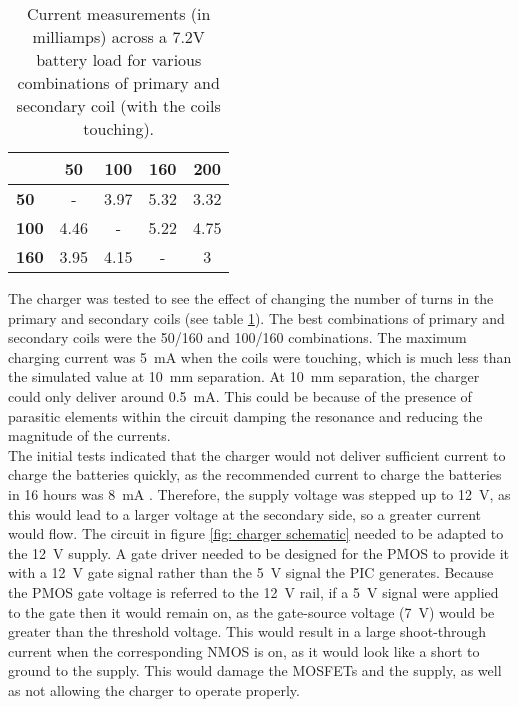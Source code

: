 \begin{table}[htb]
	\begin{center}
	\caption{Current measurements (in milliamps) across a 7.2V battery load for various combinations of primary and secondary coil (with the coils touching).}
	\label{tab: coil combinations}
	\begin{tabular}{|l|*{4}{c|}}
		\hline
		\backslashbox{\textbf{Primary Turns}}{\textbf{Secondary Turns}} & \textbf{50} & \textbf{100} & \textbf{160} & \textbf{200} \\
		\hline
		\textbf{50} & - & 3.97 & 5.32 & 3.32 \\
		\hline
		\textbf{100} & 4.46 & - & 5.22 & 4.75 \\
		\hline
		\textbf{160} & 3.95 & 4.15 & - & 3\\
		\hline
	\end{tabular}
	\end{center}
\end{table}

The charger was tested to see the effect of changing the number of turns in the primary and secondary coils (see table \ref{tab: coil combinations}). The best combinations of primary and secondary coils were the 50/160 and 100/160 combinations. The maximum charging current was \SI{5}{\milli\ampere} when the coils were touching, which is much less than the simulated value at \SI{10}{\milli\metre} separation. At \SI{10}{\milli\metre} separation, the charger could only deliver around \SI{0.5}{\milli\ampere}. This could be because of the presence of parasitic elements within the circuit damping the resonance and reducing the magnitude of the currents. \\ 



The initial tests indicated that the charger would not deliver sufficient current to charge the batteries quickly, as the recommended current to charge the batteries in 16 hours was \SI{8}{\milli\ampere} \cite{rs_pro_batteries}. Therefore, the supply voltage was stepped up to \SI{12}{\volt}, as this would lead to a larger voltage at the secondary side, so a greater current would flow. The circuit in figure \ref{fig: charger schematic} needed to be adapted to the \SI{12}{\volt} supply. A gate driver needed to be designed for the PMOS to provide it with a \SI{12}{\volt} gate signal rather than the \SI{5}{\volt} signal the PIC generates. Because the PMOS gate voltage is referred to the \SI{12}{\volt} rail, if a \SI{5}{\volt} signal were applied to the gate then it would remain on, as the gate-source voltage (\SI{7}{\volt}) would be greater than the threshold voltage. This would result in a large shoot-through current when the corresponding NMOS is on, as it would look like a short to ground to the supply. This would damage the MOSFETs and the supply, as well as not allowing the charger to operate properly. \\

